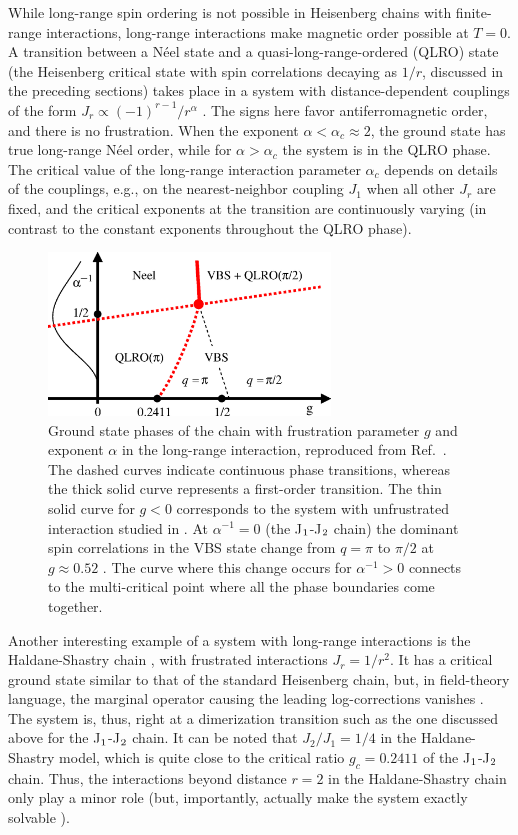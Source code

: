 \documentclass[draft,numberedheadings]{aipproc}
\begin{document}
While long-range spin ordering is not possible in Heisenberg chains with finite-range interactions, long-range interactions make magnetic order 
possible at $T=0$. A transition between a N\'eel state and a quasi-long-range-ordered (QLRO) state (the Heisenberg critical state with spin 
correlations decaying as $1/r$, discussed in the preceding sections) takes place in a system with distance-dependent couplings of the form 
$J_r \propto (-1)^{r-1}/r^\alpha$ \cite{laflorencie}. The signs here favor antiferromagnetic order, and there is no frustration. When the 
exponent $\alpha<\alpha_c \approx 2$, the ground state has true long-range N\'eel order, while for $\alpha>\alpha_c$ the system is in the
QLRO phase. The critical value of the long-range interaction parameter $\alpha_c$ depends on details of the couplings, e.g., on the nearest-neighbor 
coupling $J_1$ when all other $J_r$ are fixed, and the critical exponents at the transition are continuously varying (in contrast to the constant 
exponents throughout the QLRO phase). 

\begin{figure}
\includegraphics[width=7.5cm, clip]{lrphases.eps}
\caption{Ground state phases of the chain with frustration parameter $g$ and exponent $\alpha$ in the long-range interaction, reproduced from
Ref.~\cite{awslr}. The dashed curves indicate continuous phase transitions, whereas the thick solid curve represents a first-order transition. 
The thin solid curve for $g<0$ corresponds to the system with unfrustrated interaction studied in \cite{laflorencie}. At $\alpha^{-1}=0$ 
(the J$_{\rm 1}$-J$_{\rm 2}$ chain) the dominant spin correlations in the VBS state change from $q=\pi$ to $\pi/2$ at $g\approx 0.52$ 
\cite{bursill96}. The curve where this change occurs for $\alpha^{-1}>0$ connects to the multi-critical point where all the phase boundaries 
come together.}
\label{lrphases}
\end{figure}

Another interesting example of a system with long-range interactions is the Haldane-Shastry chain \cite{haldane2,shastry88}, with frustrated interactions 
$J_r = 1/r^2$. It has a critical ground state similar to that of the standard Heisenberg chain, but, in field-theory language, the marginal operator causing the 
leading log-corrections vanishes \cite{essler}. The system is, thus, right at a dimerization transition such as the one discussed above for the 
J$_{\rm 1}$-J$_{\rm 2}$ chain. It can be noted that $J_2/J_1=1/4$ in the Haldane-Shastry model, which is quite close to the critical ratio $g_c=0.2411$ of 
the J$_{\rm 1}$-J$_{\rm 2}$ chain. Thus, the interactions beyond distance $r=2$ in the Haldane-Shastry chain only play a minor role (but, importantly, 
actually make the system exactly solvable \cite{haldane2}).
\end{document}
